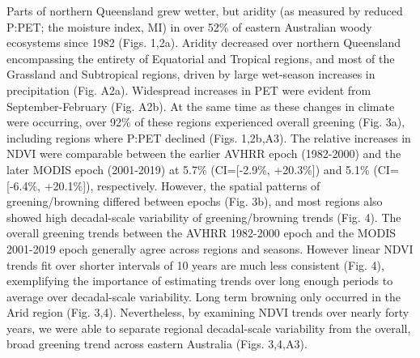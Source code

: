 \documentclass[gc, manuscript]{copernicus}
\begin{document}
Parts of northern Queensland grew wetter, but aridity (as measured by
reduced P:PET; the moisture index, MI) in over 52\% of eastern
Australian woody ecosystems since 1982 (Figs. 1,2a). Aridity decreased
over northern Queensland encompassing the entirety of Equatorial and
Tropical regions, and most of the Grassland and Subtropical regions,
driven by large wet-season increases in precipitation (Fig. A2a).
Widespread increases in PET were evident from September-February (Fig.
A2b). At the same time as these changes in climate were occurring, over
92\% of these regions experienced overall greening (Fig. 3a), including
regions where P:PET declined (Figs. 1,2b,A3). The relative increases in
NDVI were comparable between the earlier AVHRR epoch (1982-2000) and the
later MODIS epoch (2001-2019) at 5.7\% (CI={[}-2.9\%, +20.3\%{]}) and
5.1\% (CI={[}-6.4\%, +20.1\%{]}), respectively. However, the spatial
patterns of greening/browning differed between epochs (Fig. 3b), and
most regions also showed high decadal-scale variability of
greening/browning trends (Fig. 4). The overall greening trends between
the AVHRR 1982-2000 epoch and the MODIS 2001-2019 epoch generally agree
across regions and seasons. However linear NDVI trends fit over shorter
intervals of 10 years are much less consistent (Fig. 4), exemplifying
the importance of estimating trends over long enough periods to average
over decadal-scale variability. Long term browning only occurred in the
Arid region (Fig. 3,4). Nevertheless, by examining NDVI trends over
nearly forty years, we were able to separate regional decadal-scale
variability from the overall, broad greening trend across eastern
Australia (Figs. 3,4,A3).
\end{document}
